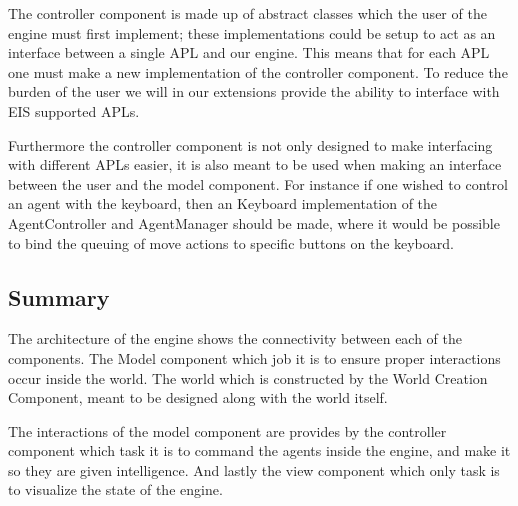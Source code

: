 The controller component is made up of abstract classes which the
user of the engine must first implement; these implementations could
be setup to act as an interface between a single APL and our engine.
This means that for each APL one must make a new implementation of
the controller component. To reduce the burden of the user we will
in our extensions provide the ability to interface with EIS supported
APLs.

Furthermore the controller component is not only designed to make
interfacing with different APLs easier, it is also meant to be used
when making an interface between the user and the model component.
For instance if one wished to control an agent with the keyboard,
then an Keyboard implementation of the AgentController and AgentManager
should be made, where it would be possible to bind the queuing of
move actions to specific buttons on the keyboard. 


\subsection*{Summary}

The architecture of the engine shows the connectivity between each
of the components. The Model component which job it is to ensure proper
interactions occur inside the world. The world which is constructed
by the World Creation Component, meant to be designed along with the
world itself. 

The interactions of the model component are provides by the controller
component which task it is to command the agents inside the engine,
and make it so they are given intelligence. And lastly the view component
which only task is to visualize the state of the engine.
